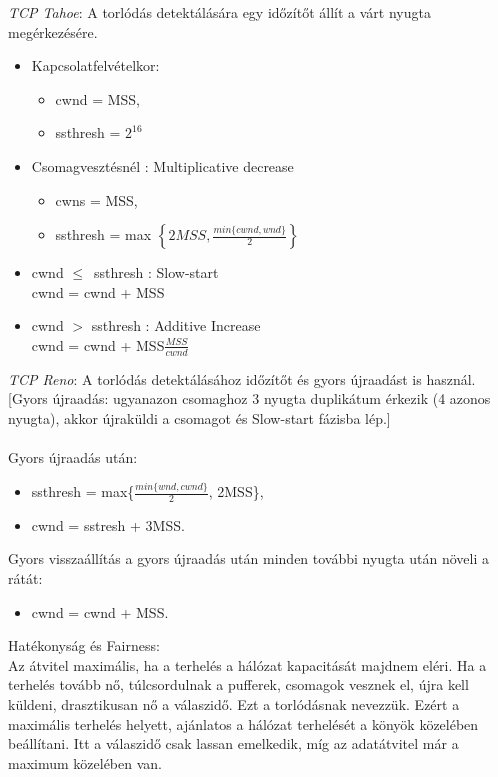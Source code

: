 \documentclass[12pt]{article}
\begin{document}
\begin{itemize}
		\noindent \emph{TCP Tahoe}: A torlódás detektálására egy időzítőt állít a várt nyugta megérkezésére.
		\begin{itemize}
			\item Kapcsolatfelvételkor:
            \begin{itemize}
                \item cwnd = MSS,
                \item ssthresh = $2^{16}$
            \end{itemize}
			\item Csomagvesztésnél : Multiplicative decrease
            \begin{itemize}
                \item cwns = MSS,
                \item ssthresh = max $\left\{2MSS, \frac{min\{cwnd, wnd\}}{2}\right\}$
            \end{itemize}
			\item cwnd $\leq$\ ssthresh : Slow-start \\
            cwnd = cwnd + MSS
			\item cwnd $>$ ssthresh : Additive Increase \\
            cwnd = cwnd + MSS$\frac{MSS}{cwnd}$
		\end{itemize}
		\noindent \emph{TCP Reno}: A torlódás detektálásához időzítőt és gyors újraadást is használ. [Gyors újraadás: ugyanazon csomaghoz 3 nyugta duplikátum érkezik (4 azonos nyugta), akkor újraküldi a csomagot és Slow-start fázisba lép.] \\\\
		Gyors újraadás után:
        \begin{itemize}
            \item ssthresh = max\{$\frac{min\{wnd,cwnd\}}{2}$, 2MSS\},
            \item cwnd = sstresh + 3MSS.
        \end{itemize}
		Gyors visszaállítás a gyors újraadás után minden további nyugta után növeli a rátát:
        \begin{itemize}
            \item cwnd = cwnd + MSS.
        \end{itemize}
	\end{itemize}

	\noindent Hatékonyság és Fairness: \\
    Az átvitel maximális, ha a terhelés a hálózat kapacitását majdnem eléri. Ha a terhelés tovább nő, túlcsordulnak a pufferek, csomagok vesznek el, újra kell küldeni, drasztikusan nő a válaszidő. Ezt a torlódásnak nevezzük. Ezért a maximális terhelés helyett, ajánlatos a hálózat terhelését a könyök közelében beállítani. Itt a válaszidő csak lassan emelkedik, míg az adatátvitel már a maximum közelében van.\\
\end{document}

